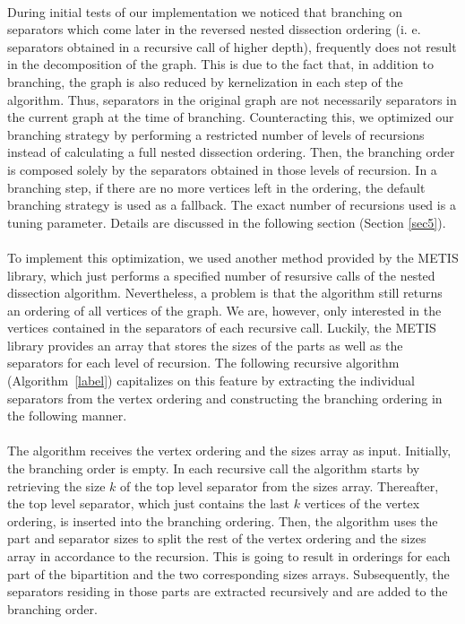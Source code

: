 \documentclass[]{article}
\begin{document}
\paragraph{} 
During initial tests of our implementation we noticed that branching on separators which come later in the reversed nested dissection ordering (i. e. separators obtained in a recursive call of higher depth), frequently does not result in the decomposition of the graph. This is due to the fact that, in addition to branching, the graph is also reduced by kernelization in each step of the algorithm. Thus, separators in the original graph are not necessarily separators in the current graph at the time of branching. Counteracting this, we optimized our branching strategy by performing a restricted number of levels of recursions instead of calculating a full nested dissection ordering. Then, the branching order is composed solely by the separators obtained in those levels of recursion. In a branching step, if there are no more vertices left in the ordering, the default branching strategy is used as a fallback. The exact number of recursions used is a tuning parameter. Details are discussed in the following section (Section \ref{sec5}).
\paragraph{}
To implement this optimization, we used another method provided by the METIS library, which just performs a specified number of resursive calls of the nested dissection algorithm. Nevertheless, a problem is that the algorithm still returns an ordering of all vertices of the graph. We are, however, only interested in the vertices contained in the separators of each recursive call. Luckily, the METIS library provides an array that stores the sizes of the parts as well as the separators for each level of recursion. The following recursive algorithm (Algorithm~\ref{label}) capitalizes on this feature by extracting the individual separators from the vertex ordering and constructing the branching ordering in the following manner.
 
\paragraph{}
The algorithm receives the vertex ordering and the sizes array as input. Initially, the branching order is empty. In each recursive call the algorithm starts by retrieving the size $k$ of the top level separator from the sizes array. Thereafter, the top level separator, which just contains the last $k$ vertices of the vertex ordering, is inserted into the branching ordering. Then, the algorithm uses the part and separator sizes to split the rest of the vertex ordering and the sizes array in accordance to the recursion. This is going to result in orderings for each part of the bipartition and the two corresponding sizes arrays. Subsequently, the separators residing in those parts are extracted recursively and are added to the branching order.
\end{document}
